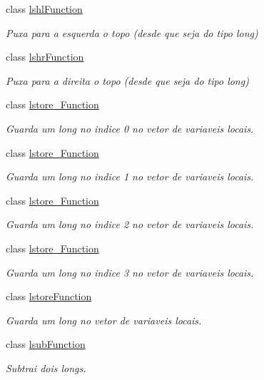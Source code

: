 \begin{DoxyCompactItemize}
class \hyperlink{classInstruction_1_1lshlFunction}{lshl\+Function}
\begin{DoxyCompactList}\small\item\em Puxa para a esquerda o topo (desde que seja do tipo long) \end{DoxyCompactList}\item 
class \hyperlink{classInstruction_1_1lshrFunction}{lshr\+Function}
\begin{DoxyCompactList}\small\item\em Puxa para a direita o topo (desde que seja do tipo long) \end{DoxyCompactList}\item 
class \hyperlink{classInstruction_1_1lstore__0Function}{lstore\+\_\+Function}
\begin{DoxyCompactList}\small\item\em Guarda um long no indice 0 no vetor de variaveis locais. \end{DoxyCompactList}\item 
class \hyperlink{classInstruction_1_1lstore__1Function}{lstore\+\_\+Function}
\begin{DoxyCompactList}\small\item\em Guarda um long no indice 1 no vetor de variaveis locais. \end{DoxyCompactList}\item 
class \hyperlink{classInstruction_1_1lstore__2Function}{lstore\+\_\+Function}
\begin{DoxyCompactList}\small\item\em Guarda um long no indice 2 no vetor de variaveis locais. \end{DoxyCompactList}\item 
class \hyperlink{classInstruction_1_1lstore__3Function}{lstore\+\_\+Function}
\begin{DoxyCompactList}\small\item\em Guarda um long no indice 3 no vetor de variaveis locais. \end{DoxyCompactList}\item 
class \hyperlink{classInstruction_1_1lstoreFunction}{lstore\+Function}
\begin{DoxyCompactList}\small\item\em Guarda um long no vetor de variaveis locais. \end{DoxyCompactList}\item 
class \hyperlink{classInstruction_1_1lsubFunction}{lsub\+Function}
\begin{DoxyCompactList}\small\item\em Subtrai dois longs. \end{DoxyCompactList}\item 

\end{DoxyCompactItemize}
